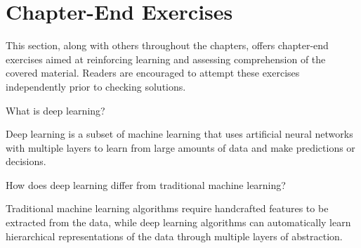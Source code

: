 %
%
%

\newpage

\section{Chapter-End Exercises}\label{sec:exercises}

This section, along with others throughout the chapters, offers chapter-end exercises aimed at reinforcing learning and assessing comprehension of the covered material. Readers are encouraged to attempt these exercises independently prior to checking solutions.

\begin{question}
    What is deep learning?
\end{question}

\begin{answer}
    Deep learning is a subset of machine learning that uses artificial neural networks with multiple layers to learn from large amounts of data and make predictions or decisions.
\end{answer}

\begin{question}
    How does deep learning differ from traditional machine learning?
\end{question}

\begin{answer}
    Traditional machine learning algorithms require handcrafted features to be extracted from the data, while deep learning algorithms can automatically learn hierarchical representations of the data through multiple layers of abstraction.
\end{answer}


